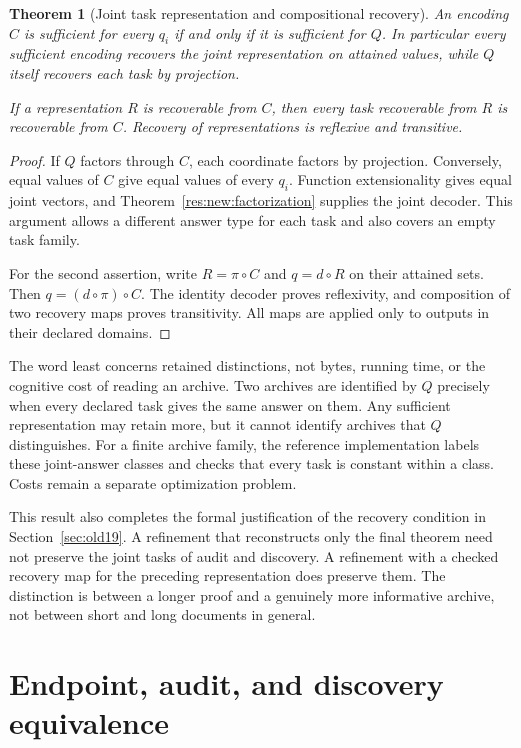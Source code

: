\documentclass[11pt,oneside]{article}
\theoremstyle{komorebiplain}
\newtheorem{theorem}{Theorem}[section]
\theoremstyle{komorebidefinition}
\theoremstyle{komorebiremark}
\begin{document}
\begin{theorem}[Joint task representation and compositional recovery]
\label{res:new:joint}
An encoding $C$ is sufficient for every $q_i$ if and only if it is sufficient for $Q$. In particular every sufficient encoding recovers the joint representation on attained values, while $Q$ itself recovers each task by projection.

If a representation $R$ is recoverable from $C$, then every task recoverable from $R$ is recoverable from $C$. Recovery of representations is reflexive and transitive.
\end{theorem}
\begin{proof}
If $Q$ factors through $C$, each coordinate factors by projection. Conversely, equal values of $C$ give equal values of every $q_i$. Function extensionality gives equal joint vectors, and Theorem~\ref{res:new:factorization} supplies the joint decoder. This argument allows a different answer type for each task and also covers an empty task family.

For the second assertion, write $R=\pi\circ C$ and $q=d\circ R$ on their attained sets. Then $q=(d\circ\pi)\circ C$. The identity decoder proves reflexivity, and composition of two recovery maps proves transitivity. All maps are applied only to outputs in their declared domains.
\end{proof}

The word least concerns retained distinctions, not bytes, running time, or the cognitive cost of reading an archive. Two archives are identified by $Q$ precisely when every declared task gives the same answer on them. Any sufficient representation may retain more, but it cannot identify archives that $Q$ distinguishes. For a finite archive family, the reference implementation labels these joint-answer classes and checks that every task is constant within a class. Costs remain a separate optimization problem.

This result also completes the formal justification of the recovery condition in Section~\ref{sec:old19}. A refinement that reconstructs only the final theorem need not preserve the joint tasks of audit and discovery. A refinement with a checked recovery map for the preceding representation does preserve them. The distinction is between a longer proof and a genuinely more informative archive, not between short and long documents in general.


\section{Endpoint, audit, and discovery equivalence}
\label{sec:old8}
\end{document}
